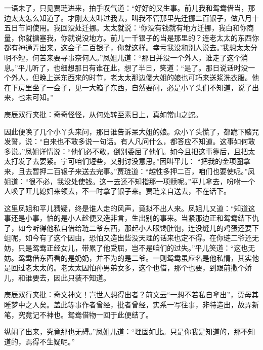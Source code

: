 \begin{parag}
    一语未了，只见贾琏进来，拍手叹气道：“好好的又生事。前儿我和鸳鸯借当，那边太太怎么知道了。才刚太太叫过我去，叫我不管那里先迁挪二百银子，做八月十五日节间使用。我回没处迁挪。太太就说：‘你没有钱就有地方迁挪，我白和你商量，你就搪塞我，你就说没地方。前儿一千银子的当是那里的？连老太太的东西你都有神通弄出来，这会子二百银子，你就这样。幸亏我没和别人说去。’我想太太分明不短，何苦来要寻事奈何人。”凤姐儿道：“那日并没一个外人，谁走了这个消息。”平儿听了，也细想那日有谁在此，想了半日，笑道：“是了。那日说话时没一个外人，但晚上送东西来的时节，老太太那边傻大姐的娘也可巧来送浆洗衣服。他在下房里坐了一会子，见一大箱子东西，自然要问，必是小丫头们不知道，说了出来，也未可知。”\begin{note}庚辰双行夹批：奇奇怪怪，从何处转至素日上，真如常山之蛇。\end{note}因此便唤了几个小丫头来问，那日谁告诉呆大姐的娘。众小丫头慌了，都跪下赌咒发誓，说：“自来也不敢多说一句话。有人凡问什么，都答应不知道。这事如何敢多说。”凤姐详情说：“他们必不敢，倒别委屈了他们。如今且把这事靠后，且把太太打发了去要紧。宁可咱们短些，又别讨没意思。”因叫平儿： “把我的金项圈拿来，且去暂押二百银子来送去完事。”贾琏道：“越性多押二百，咱们也要使呢。”凤姐道：“很不必，我没处使钱。这一去还不知指那一项赎呢。”平儿拿去，吩咐一个人唤了旺儿媳妇来领去，不一时拿了银子来。贾琏亲自送去，不在话下。
\end{parag}


\begin{parag}
    这里凤姐和平儿猜疑，终是谁人走的风声，竟拟不出人来。凤姐儿又道：“知道这事还是小事，怕的是小人趁便又造非言，生出别的事来。当紧那边正和鸳鸯结下仇了，如今听得他私自借给琏二爷东西，那起小人眼馋肚饱，连没缝儿的鸡蛋还要下蛆呢，如今有了这个因由，恐怕又造出些没天理的话来也定不得。在你琏二爷还无妨，只是鸳鸯正经女儿，带累了他受屈，岂不是咱们的过失。”平儿笑道：“这也无妨。鸳鸯借东西看的是奶奶，并不为的是二爷。一则鸳鸯虽应名是他私情，其实他是回过老太太的。老太太因怕孙男弟女多，这个也借，那个也要，到跟前撒个娇儿，和谁要去，因此只装不知道。\begin{note}庚辰双行夹批：奇文神文！岂世人想得出者？前文云“一想不若私自拿出”，贾母其睡梦中之人矣。盖此等事作者曾经，批者曾经，实系一写往事，非特造出，故弄新笔，究竟记不神也。鸳鸯借物一回于此便结了。\end{note}纵闹了出来，究竟那也无碍。”凤姐儿道：“理固如此。只是你我是知道的，那不知道的，焉得不生疑呢。”
\end{parag}



